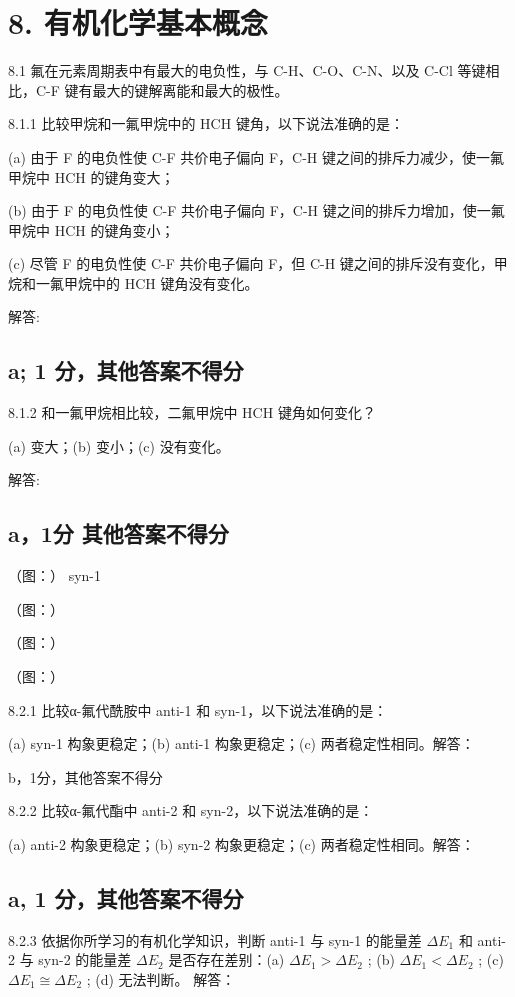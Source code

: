 \section*{8. 有机化学基本概念}
8.1 氟在元素周期表中有最大的电负性，与 C-H、C-O、C-N、以及 C-Cl 等键相比，C-F 键有最大的键解离能和最大的极性。

8.1.1 比较甲烷和一氟甲烷中的 HCH 键角，以下说法准确的是：

(a) 由于 F 的电负性使 C-F 共价电子偏向 F，C-H 键之间的排斥力减少，使一氟甲烷中 HCH 的键角变大；

(b) 由于 F 的电负性使 C-F 共价电子偏向 F，C-H 键之间的排斥力增加，使一氟甲烷中 HCH 的键角变小；

(c) 尽管 F 的电负性使 C-F 共价电子偏向 F，但 C-H 键之间的排斥没有变化，甲烷和一氟甲烷中的 HCH 键角没有变化。

解答:

\subsection*{a; 1 分，其他答案不得分}

8.1.2 和一氟甲烷相比较，二氟甲烷中 HCH 键角如何变化？

(a) 变大；(b) 变小；(c) 没有变化。

解答:

\subsection*{a，1分 其他答案不得分}

（图：）
syn-1

（图：）

（图：）

（图：）

8.2.1 比较α-氟代酰胺中 anti-1 和 syn-1，以下说法准确的是：

(a) syn-1 构象更稳定；(b) anti-1 构象更稳定；(c) 两者稳定性相同。解答：

b，1分，其他答案不得分

8.2.2 比较α-氟代酯中 anti-2 和 syn-2，以下说法准确的是：

(a) anti-2 构象更稳定；(b) syn-2 构象更稳定；(c) 两者稳定性相同。解答：

\subsection*{a, 1 分，其他答案不得分}

8.2.3 依据你所学习的有机化学知识，判断 anti-1 与 syn-1 的能量差 $\Delta E_{1}$ 和 anti-2 与 syn-2 的能量差 $\Delta E_{2}$ 是否存在差别：(a) $\Delta E_{1} > \Delta E_{2}$ ; (b) $\Delta E_{1} < \Delta E_{2}$ ; (c) $\Delta E_{1} \cong \Delta E_{2}$ ; (d) 无法判断。
解答：

